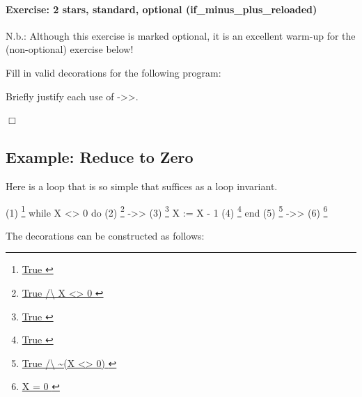 \documentclass[12pt]{report}
\begin{document}
\paragraph{Exercise: 2 stars, standard, optional (if\_minus\_plus\_reloaded)}




    N.b.: Although this exercise is marked optional, it is an
    excellent warm-up for the (non-optional) 
    exercise below!


    Fill in valid decorations for the following program: 
\begin{coqdoccode}
\end{coqdoccode}
    Briefly justify each use of ->>.


 \ensuremath{\Box} 
\begin{coqdoccode}
\coqdocemptyline
\end{coqdoccode}
\subsection{Example: Reduce to Zero}



 Here is a  loop that is so simple that  suffices
    as a loop invariant.


        (1)    \footnote{\url{ True }}
                 while X <> 0 do
        (2)                  \footnote{\url{ True /\ X <> 0 }} ->>
        (3)                  \footnote{\url{ True }}
                   X := X - 1
        (4)                  \footnote{\url{ True }}
                 end
        (5)    \footnote{\url{ True /\ ~(X <> 0) }} ->>
        (6)    \footnote{\url{ X = 0 }}


   The decorations can be constructed as follows:
\end{document}
